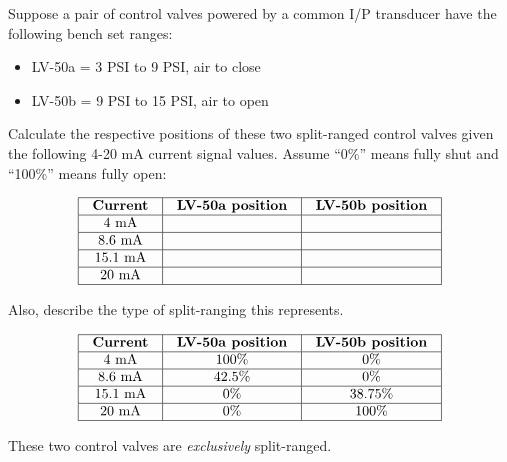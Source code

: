 

Suppose a pair of control valves powered by a common I/P transducer have the following bench set ranges:

\begin{itemize}
\item{} LV-50a = 3 PSI to 9 PSI, air to close
\item{} LV-50b = 9 PSI to 15 PSI, air to open
\end{itemize}

Calculate the respective positions of these two split-ranged control valves given the following 4-20 mA current signal values.  Assume ``0\%'' means fully shut and ``100\%'' means fully open:


$$\vbox{\offinterlineskip
\halign{\strut
\vrule \quad\hfil # \ \hfil & 
\vrule \quad\hfil # \ \hfil & 
\vrule \quad\hfil # \ \hfil \vrule \cr
\noalign{\hrule}
%
{\bf Current} & {\bf LV-50a position} & {\bf LV-50b position} \cr
%
\noalign{\hrule}
%
4 mA &  &  \cr
%
\noalign{\hrule}
%
8.6 mA &  &  \cr
%
\noalign{\hrule}
%
15.1 mA &  &  \cr
%
\noalign{\hrule}
%
20 mA &  &  \cr
%
\noalign{\hrule}
} %
}$$ %

Also, describe the type of split-ranging this represents.








$$\vbox{\offinterlineskip
\halign{\strut
\vrule \quad\hfil # \ \hfil & 
\vrule \quad\hfil # \ \hfil & 
\vrule \quad\hfil # \ \hfil \vrule \cr
\noalign{\hrule}
%
{\bf Current} & {\bf LV-50a position} & {\bf LV-50b position} \cr
%
\noalign{\hrule}
%
4 mA & 100\% & 0\% \cr
%
\noalign{\hrule}
%
8.6 mA & 42.5\% & 0\% \cr
%
\noalign{\hrule}
%
15.1 mA & 0\% & 38.75\% \cr
%
\noalign{\hrule}
%
20 mA & 0\% & 100\% \cr
%
\noalign{\hrule}
} %
}$$ %

These two control valves are {\it exclusively} split-ranged.












